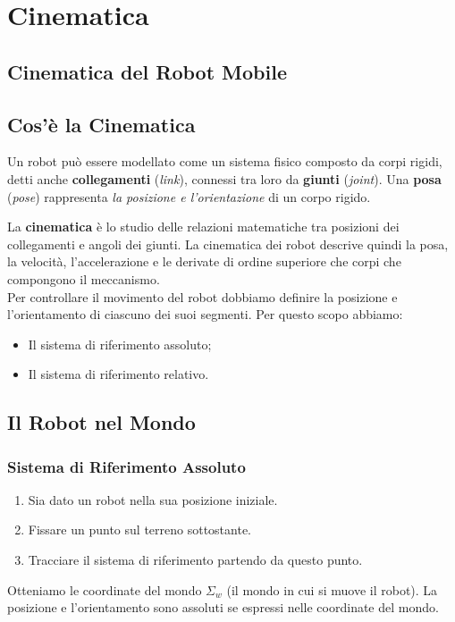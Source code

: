 \documentclass[a4paper,portrait,12pt]{article}
\theoremstyle{definition}
\begin{document}
\section{Cinematica}



\subsection{Cinematica del Robot Mobile}



\subsection{Cos'è la Cinematica}
Un robot può essere modellato come un sistema fisico composto da corpi rigidi, detti anche \textbf{collegamenti} (\emph{link}), connessi tra loro da \textbf{giunti} (\emph{joint}). Una \textbf{posa} (\emph{pose}) rappresenta \emph{la posizione e l'orientazione} di un corpo rigido.

La \textbf{cinematica} è lo studio delle relazioni matematiche tra posizioni dei collegamenti e angoli dei giunti.
La cinematica dei robot descrive quindi la posa, la velocità, l'accelerazione e le derivate di ordine superiore che corpi che compongono il meccanismo.\\

Per controllare il movimento del robot dobbiamo definire la posizione e l'orientamento di ciascuno dei suoi segmenti.
Per questo scopo abbiamo:
\begin{itemize}
\item Il sistema di riferimento assoluto;
\item Il sistema di riferimento relativo.
\end{itemize}

\subsection{Il Robot nel Mondo}

\subsubsection{Sistema di Riferimento Assoluto}

\begin{enumerate}
\item Sia dato un robot nella sua posizione iniziale.
\item Fissare un punto sul terreno sottostante.
\item Tracciare il sistema di riferimento partendo da questo punto.
\end{enumerate}
Otteniamo le coordinate del mondo $\Sigma_w$ (il mondo in cui si muove il robot).
La posizione e l'orientamento sono assoluti se espressi nelle coordinate del mondo.
\end{document}
